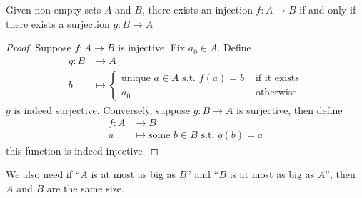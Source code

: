 \documentclass{article}
\begin{document}
\begin{nlemma}\label{lem:5-12}
    Given non-empty sets $A$ and $B$, there exists an injection $f: A \rightarrow B$
    if and only if there exists a surjection $g: B \rightarrow A$
\end{nlemma}
\begin{proof}
    Suppose $f: A \rightarrow B$ is injective.
    Fix $a_0 \in A$.
    Define
    \begin{align*}
        g : B &\rightarrow A \\
        b &\mapsto \begin{cases}
            \text{unique } a \in A \text{ s.t. } f(a) = b & \text{ if it exists} \\
            a_0 & \text{ otherwise}
        \end{cases}
    \end{align*}
    $g$ is indeed surjective.
    Conversely, suppose $g : B \rightarrow A$ is surjective, then define
    \begin{align*}
        f: A &\rightarrow B \\
        a &\mapsto \text{some } b \in B \text{ s.t. } g(b) = a 
    \end{align*}
    this function is indeed injective.
\end{proof}

We also need if ``$A$ is at most as big as $B$'' and ``$B$ is at most as big as $A$'',
then $A$ and $B$ are the same size.
\end{document}
